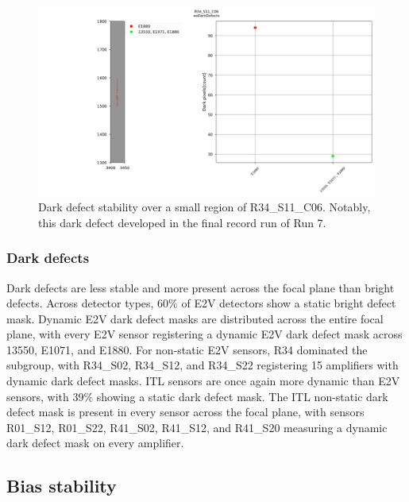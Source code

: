 
\begin{figure}[H]
    \centering
    \includegraphics[width=\linewidth]{figures/R34_S11_C06(2).jpg}
    \caption{Dark defect stability over a small region of R34\_S11\_C06. Notably, this dark defect developed in the final record run of Run 7.}
    \label{fig:DarkDefectStability}
\end{figure}

\subsubsection{Dark defects}

Dark defects are less stable and more present across the focal plane than bright defects. Across detector types, 60\% of E2V detectors show a static bright defect mask. Dynamic E2V dark defect masks are distributed across the entire focal plane, with every E2V sensor registering a dynamic E2V dark defect mask across 13550, E1071, and E1880. For non-static E2V sensors, R34 dominated the subgroup, with R34\_S02, R34\_S12, and R34\_S22 registering 15 amplifiers with dynamic dark defect masks. ITL sensors are once again more dynamic than E2V sensors, with 39\% showing a static dark defect mask. The ITL non-static dark defect mask is present in every sensor across the focal plane, with sensors R01\_S12, R01\_S22, R41\_S02, R41\_S12, and R41\_S20 measuring a dynamic dark defect mask on every amplifier.



\subsection{Bias stability}\label{sec:bias-stability-2}

